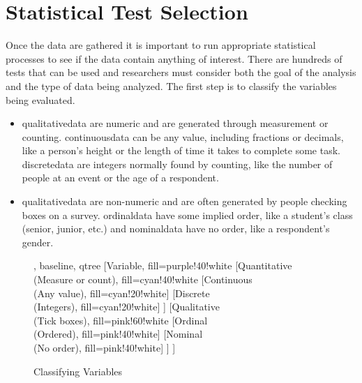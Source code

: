 \section{Statistical Test Selection}

Once the data are gathered it is important to run appropriate statistical processes to see if the data contain anything of interest. There are hundreds of tests that can be used and researchers must consider both the goal of the analysis and the type of data being analyzed. The first step is to classify the variables being evaluated. 

\begin{itemize}
	\item \Gls{qualitativedata} are numeric and are generated through measurement or counting. \gls{continuousdata} can be any value, including fractions or decimals, like a person's height or the length of time it takes to complete some task. \Gls{discretedata} are integers normally found by counting, like the number of people at an event or the age of a respondent.
	\item \Gls{qualitativedata} are non-numeric and are often generated by people checking boxes on a survey. \Gls{ordinaldata} have some implied order, like a student's class (senior, junior, etc.) and \gls{nominaldata} have no order, like a respondent's gender.
\end{itemize}

\begin{figure}[H]
	\centering

		
	\begin{forest}, baseline, qtree
		[Variable, fill=purple!40!white
			[{Quantitative\\(Measure or count)}, fill=cyan!40!white
				[{Continuous\\(Any value)}, fill=cyan!20!white]
				[{Discrete\\(Integers)}, fill=cyan!20!white]
			]
			[{Qualitative\\(Tick boxes)}, fill=pink!60!white
				[{Ordinal\\(Ordered)}, fill=pink!40!white]
				[{Nominal\\(No order)}, fill=pink!40!white]
			]
		]
	\end{forest}

	\caption{Classifying Variables}
	\label{fig06.08}
\end{figure}

